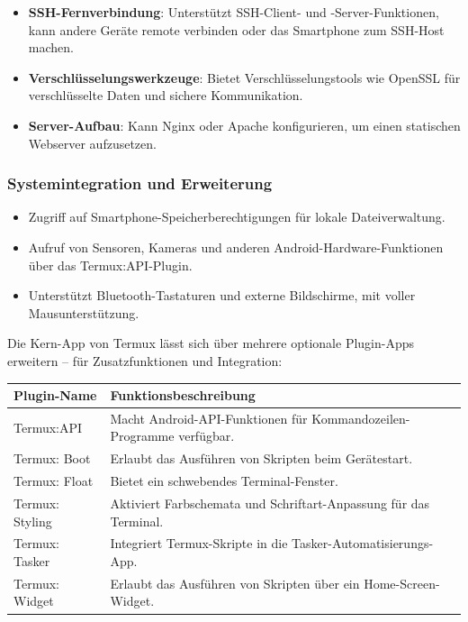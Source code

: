 \begin{itemize}
  \item \textbf{SSH-Fernverbindung}: Unterstützt SSH-Client- und -Server-Funktionen, kann andere Geräte remote verbinden oder das Smartphone zum SSH-Host machen.
  \item \textbf{Verschlüsselungswerkzeuge}: Bietet Verschlüsselungstools wie OpenSSL für verschlüsselte Daten und sichere Kommunikation.
  \item \textbf{Server-Aufbau}: Kann Nginx oder Apache konfigurieren, um einen statischen Webserver aufzusetzen.
\end{itemize}

\subsubsection*{Systemintegration und Erweiterung}

\begin{itemize}
  \item Zugriff auf Smartphone-Speicherberechtigungen für lokale Dateiverwaltung.
  \item Aufruf von Sensoren, Kameras und anderen Android-Hardware-Funktionen über das Termux:API-Plugin.
  \item Unterstützt Bluetooth-Tastaturen und externe Bildschirme, mit voller Mausunterstützung.
\end{itemize}


Die Kern-App von Termux lässt sich über mehrere optionale Plugin-Apps erweitern – für Zusatzfunktionen und Integration:

\begin{center}
\begin{tabularx}{\linewidth}{|X|X|}
\hline
\textbf{Plugin-Name} & \textbf{Funktionsbeschreibung} \tabularnewline
\hline
Termux:API & Macht Android-API-Funktionen für Kommandozeilen-Programme verfügbar. \tabularnewline
Termux: Boot & Erlaubt das Ausführen von Skripten beim Gerätestart. \tabularnewline
Termux: Float & Bietet ein schwebendes Terminal-Fenster. \tabularnewline
Termux: Styling & Aktiviert Farbschemata und Schriftart-Anpassung für das Terminal. \tabularnewline
Termux: Tasker & Integriert Termux-Skripte in die Tasker-Automatisierungs-App. \tabularnewline
Termux: Widget & Erlaubt das Ausführen von Skripten über ein Home-Screen-Widget. \tabularnewline
\hline
\end{tabularx}
\end{center}

